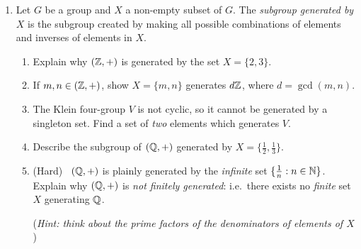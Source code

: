\begin{exercises}
\begin{enumerate}
		
		\item\label{exs:finitegen} Let $G$ be a group and $X$ a non-empty subset of $G$. The \emph{subgroup generated by $X$} is the subgroup created by making all possible combinations of elements and inverses of elements in $X$.
		\begin{enumerate}
		  \item Explain why $(\mathbb{Z},+)$ is generated by the set $X=\{2,3\}$.
		  \item If $m,n\in(\mathbb{Z},+)$, show $X=\{m,n\}$ generates $d\mathbb{Z}$, where $d=\gcd(m,n)$.
		  \item The Klein four-group $V$ is not cyclic, so it cannot be generated by a singleton set. Find a set of \emph{two} elements which generates $V$.
		  \item Describe the subgroup of $(\mathbb{Q},+)$ generated by $X=\{\frac 12,\frac 13\}$.
		  \item (Hard) \ $(\mathbb{Q},+)$ is plainly generated by the \emph{infinite} set $\{\frac 1n:n\in\mathbb{N}\}$. Explain why $(\mathbb{Q},+)$ is \emph{not finitely generated}: i.e.\ there exists no \emph{finite} set $X$ generating $\mathbb{Q}$.\par
		  (\emph{Hint: think about the prime factors of the denominators of elements of $X$})
		\end{enumerate}
		
	
	\end{enumerate}
\end{exercises}





